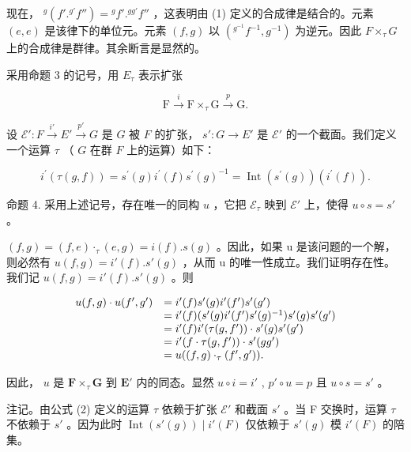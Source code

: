 现在， \({}^{g}(f'.{}^{g'}f'') = {}^{g}f'.{}^{gg'}f''\) ，这表明由 (1) 定义的合成律是结合的。元素 \((e, e)\) 是该律下的单位元。元素 \((f, g)\) 以 \((^{g^{-1}}f^{-1}, g^{-1})\) 为逆元。因此 \(F \times_{\tau} G\) 上的合成律是群律。其余断言是显然的。

采用命题 3 的记号，用 \(E_{\tau}\) 表示扩张

\[
\mathrm{F} \xrightarrow {i} \mathrm{F} \times_ {\tau} \mathrm{G} \xrightarrow {p} \mathrm{G}.
\]

设 \(\mathcal{E}'\colon F\stackrel{i'}{\to}E'\stackrel{p'}{\to}G\) 是 \(G\) 被 \(F\) 的扩张， \(s'\colon G\to E'\) 是 \(\mathcal{E}'\) 的一个截面。我们定义一个运算 \(\tau\) （ \(G\) 在群 \(F\) 上的运算）如下：

\[
i ^ {\prime} (\tau (g, f)) = s ^ {\prime} (g) i ^ {\prime} (f) s ^ {\prime} (g) ^ {- 1} = \operatorname{Int} (s ^ {\prime} (g)) (i ^ {\prime} (f)).\tag{2}
\]

命题 4. 采用上述记号，存在唯一的同构 \(u\) ，它把 \(\mathcal{E}_{\tau}\) 映到 \(\mathcal{E}'\) 上，使得 \(u \circ s = s'\) 。

\((f, g) = (f, e) \cdot_ {\tau} (e, g) = i(f).s(g)\) 。因此，如果 u 是该问题的一个解，则必然有 \(u(f,g)=i'(f).s'(g)\) ，从而 u 的唯一性成立。我们证明存在性。我们记 \(u(f,g)=i'(f).s'(g)\) 。则

\[
\begin{array}{r l} u (f, g) \cdot u (f ^ {\prime}, g ^ {\prime}) & = i ^ {\prime} (f) s ^ {\prime} (g) i ^ {\prime} (f ^ {\prime}) s ^ {\prime} (g ^ {\prime}) \\ & = i ^ {\prime} (f) (s ^ {\prime} (g) i ^ {\prime} (f ^ {\prime}) s ^ {\prime} (g) ^ {- 1}) s ^ {\prime} (g) s ^ {\prime} (g ^ {\prime}) \\ & = i ^ {\prime} (f) i ^ {\prime} (\tau (g, f ^ {\prime})) \cdot s ^ {\prime} (g) s ^ {\prime} (g ^ {\prime}) \\ & = i ^ {\prime} (f \cdot \tau (g, f ^ {\prime})) \cdot s ^ {\prime} (g g ^ {\prime}) \\ & = u ((f, g) \cdot_ {\tau} (f ^ {\prime}, g ^ {\prime})). \end{array}
\]

因此， \(u\) 是 \(\mathbf{F} \times_{\tau} \mathbf{G}\) 到 \(\mathbf{E}'\) 内的同态。显然 \(u \circ i = i'\) , \(p' \circ u = p\) 且 \(u \circ s = s'\) 。

注记。由公式 (2) 定义的运算 \(\tau\) 依赖于扩张 \(\mathcal{E}'\) 和截面 \(s'\) 。当 F 交换时，运算 \(\tau\) 不依赖于 \(s'\) 。因为此时 \(\operatorname{Int}(s'(g)) \mid i'(F)\) 仅依赖于 \(s'(g)\) 模 \(i'(F)\) 的陪集。

